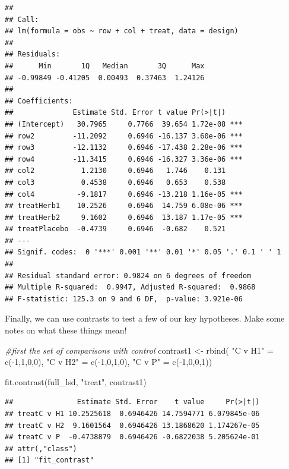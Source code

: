 \documentclass[
]{book}
\newenvironment{Shaded}{\begin{snugshade}}{\end{snugshade}}
\newcommand{\CommentTok}[1]{\textcolor[rgb]{0.56,0.35,0.01}{\textit{#1}}}
\newcommand{\DecValTok}[1]{\textcolor[rgb]{0.00,0.00,0.81}{#1}}
\newcommand{\FunctionTok}[1]{\textcolor[rgb]{0.00,0.00,0.00}{#1}}
\newcommand{\NormalTok}[1]{#1}
\newcommand{\OtherTok}[1]{\textcolor[rgb]{0.56,0.35,0.01}{#1}}
\newcommand{\SpecialCharTok}[1]{\textcolor[rgb]{0.00,0.00,0.00}{#1}}
\newcommand{\StringTok}[1]{\textcolor[rgb]{0.31,0.60,0.02}{#1}}
\begin{document}
\begin{verbatim}
## 
## Call:
## lm(formula = obs ~ row + col + treat, data = design)
## 
## Residuals:
##      Min       1Q   Median       3Q      Max 
## -0.99849 -0.41205  0.00493  0.37463  1.24126 
## 
## Coefficients:
##              Estimate Std. Error t value Pr(>|t|)    
## (Intercept)   30.7965     0.7766  39.654 1.72e-08 ***
## row2         -11.2092     0.6946 -16.137 3.60e-06 ***
## row3         -12.1132     0.6946 -17.438 2.28e-06 ***
## row4         -11.3415     0.6946 -16.327 3.36e-06 ***
## col2           1.2130     0.6946   1.746    0.131    
## col3           0.4538     0.6946   0.653    0.538    
## col4          -9.1817     0.6946 -13.218 1.16e-05 ***
## treatHerb1    10.2526     0.6946  14.759 6.08e-06 ***
## treatHerb2     9.1602     0.6946  13.187 1.17e-05 ***
## treatPlacebo  -0.4739     0.6946  -0.682    0.521    
## ---
## Signif. codes:  0 '***' 0.001 '**' 0.01 '*' 0.05 '.' 0.1 ' ' 1
## 
## Residual standard error: 0.9824 on 6 degrees of freedom
## Multiple R-squared:  0.9947, Adjusted R-squared:  0.9868 
## F-statistic: 125.3 on 9 and 6 DF,  p-value: 3.921e-06
\end{verbatim}

Finally, we can use contrasts to test a few of our key hypotheses. Make some notes on what these things mean!

\begin{Shaded}
\begin{Highlighting}[]
\CommentTok{\#first the set of comparisons with control}
\NormalTok{contrast1 }\OtherTok{\textless{}{-}} \FunctionTok{rbind}\NormalTok{(}
  \StringTok{"C v H1"} \OtherTok{=} \FunctionTok{c}\NormalTok{(}\SpecialCharTok{{-}}\DecValTok{1}\NormalTok{,}\DecValTok{1}\NormalTok{,}\DecValTok{0}\NormalTok{,}\DecValTok{0}\NormalTok{),}
  \StringTok{"C v H2"} \OtherTok{=} \FunctionTok{c}\NormalTok{(}\SpecialCharTok{{-}}\DecValTok{1}\NormalTok{,}\DecValTok{0}\NormalTok{,}\DecValTok{1}\NormalTok{,}\DecValTok{0}\NormalTok{),}
  \StringTok{"C v P"} \OtherTok{=} \FunctionTok{c}\NormalTok{(}\SpecialCharTok{{-}}\DecValTok{1}\NormalTok{,}\DecValTok{0}\NormalTok{,}\DecValTok{0}\NormalTok{,}\DecValTok{1}\NormalTok{))}

\FunctionTok{fit.contrast}\NormalTok{(full\_lsd, }\StringTok{"treat"}\NormalTok{, contrast1)}
\end{Highlighting}
\end{Shaded}

\begin{verbatim}
##               Estimate Std. Error    t value     Pr(>|t|)
## treatC v H1 10.2525618  0.6946426 14.7594771 6.079845e-06
## treatC v H2  9.1601564  0.6946426 13.1868620 1.174267e-05
## treatC v P  -0.4738879  0.6946426 -0.6822038 5.205624e-01
## attr(,"class")
## [1] "fit_contrast"
\end{verbatim}
\end{document}

